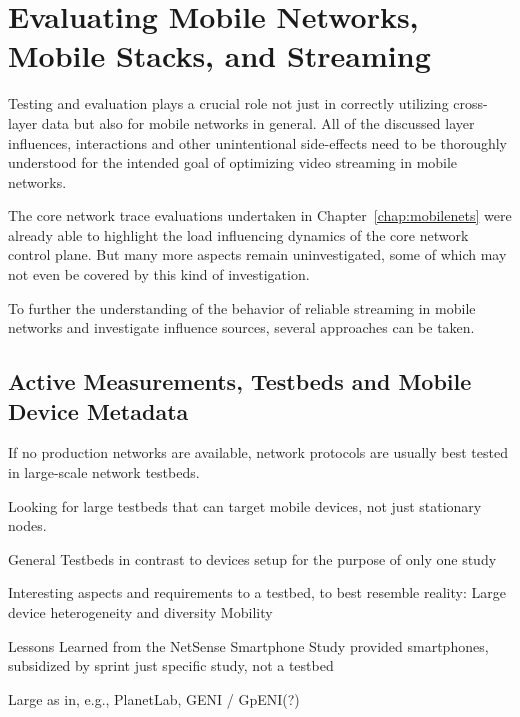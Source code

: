 \section{Evaluating Mobile Networks, Mobile Stacks, and Streaming}
\label{c5:sec:mobilestreaming-measurements}

Testing and evaluation plays a crucial role not just in correctly utilizing cross-layer data but also for mobile networks in general. All of the discussed layer influences, interactions and other unintentional side-effects need to be thoroughly understood for the intended goal of optimizing video streaming in mobile networks.

The core network trace evaluations undertaken in Chapter~\ref{chap:mobilenets} were already able to highlight the load influencing dynamics of the core network control plane. But many more aspects remain uninvestigated, some of which may not even be covered by this kind of investigation.

To further the understanding of the behavior of reliable streaming in mobile networks and investigate influence sources, several approaches can be taken.




\subsection{Active Measurements, Testbeds and Mobile Device Metadata}

If no production networks are available, network protocols are usually best tested in large-scale network testbeds.

Looking for large testbeds that can target mobile devices, not just stationary nodes.

General Testbeds in contrast to devices setup for the purpose of only one study

Interesting aspects and requirements to a testbed, to best resemble reality:
Large device heterogeneity and diversity
Mobility

Lessons Learned from the NetSense Smartphone Study \cite{Striegel:2013:LLN:2491159.2491171}
provided smartphones, subsidized by sprint
just specific study, not a testbed

Large as in, e.g., PlanetLab, GENI / GpENI(?)

